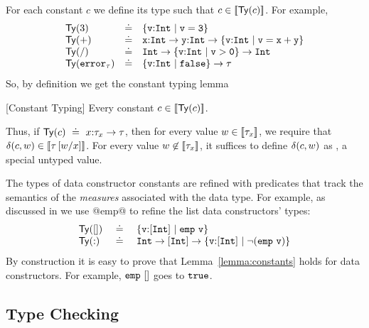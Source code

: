 For each constant $c$ we define its type 
such that $c \in \interp{\constty{c}}$. 
%
For example,
%
%
%
$$
\begin{array}{lcl}
\constty{3} &\doteq& \tttref{v}{\tint}{}{v = 3}\\
\constty{+} &\doteq& \tfun{\ttx}{\tint}{\tfun{\tty}{\tint}{\tttref{v}{\tint}{}{v = x + y}}}\\
\constty{/} &\doteq& \tfunbasic{\tint}{\tfunbasic{\tttref{v}{\tint}{}{v > 0}}{\tint}}\\
\constty{\eerror{\typ}} &\doteq& \tfunbasic{\tttref{v}{\tint}{}{\efalse}}{\typ}
\end{array}
$$
%
So, by definition we get the constant typing lemma
%
\begin{lemma}{[Constant Typing]}\label{lemma:constants}
Every constant $c \in \interp{\constty{c}}$.
\end{lemma}
%
Thus, if $\constty{c} \defeq \tfun{x}{\typ_x}{\typ}$, then for every value 
$w \in \interp{\typ_x}$, we require that $\ceval{c}{w} \in \interp{\typ\sub{x}{w}}$.
%
For every value $w \not \in \interp{\typ_x}$, it suffices to define $\ceval{c}{w}$
as \ecrash, a special untyped value.

The types of data constructor constants are refined 
with predicates that track the semantics of the 
\emph{measures} associated with the data type.
%
For example, as discussed in  
we use @emp@ to refine the list data constructors' types:
$$
\begin{array}{lcl}
\constty{\dnull}  & \defeq & \tttref{v}{\tintlist}{}{\eisNull{v}}\\
\constty{\dcons}  & \defeq & \tfunbasic{\tint}{\tfunbasic{\tintlist}{\tttref{v}{\tintlist}{}{\lnot (\eisNull{v})}}}
\end{array}
$$
%
By construction it is easy to prove that Lemma~\ref{lemma:constants}
holds for data constructors.
%
For example, $\ttemp\ \dnull$ goes to $\tttrue$.
%


\subsection{Type Checking}\label{subsec:typing}

